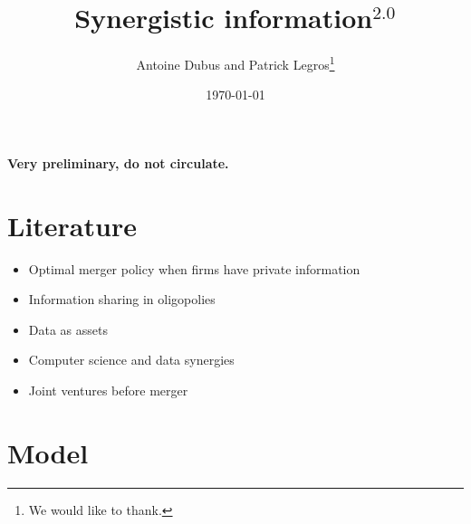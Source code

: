\documentclass[a4paper]{article}
\begin{document}
\title{Synergistic information$^{2.0}$}
\author{Antoine Dubus and Patrick Legros\thanks{We would like to thank.}}
\date{\today}


\maketitle

\begin{abstract}

\noindent 

\end{abstract}
 
\textbf{Very preliminary, do not circulate.}

\baselineskip0.7cm

\section{Literature}
\begin{itemize}\setlength\itemsep{-1em}
    \item Optimal merger policy when firms have private information \cite{Besanko1993}
    \item Information sharing in oligopolies
    \item Data as assets
    \item Computer science and data synergies
    \item Joint ventures before merger
\end{itemize}

\section{Model}
\end{document}
